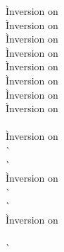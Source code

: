 \begin{description}
  \newcommand{\pushcallfnstack}{\frameexp{F}{\call{\cdot,e}}}
  \begin{tabbing}
    \` Inversion on  \\
    \` Inversion on  \\
    \` Inversion on  \\
    \` Inversion on  \\
    \` Inversion on  \\
    \` Inversion on  \\
    \` Inversion on  \\
    \` Inversion on  \\
  \\
    \` Inversion on  \\
    \`  \\
    \`  \\

    \` Inversion on  \\
    \`  \\
    \`  \\

    \` Inversion on  \\
   \\
    \`  \\


\end{tabbing}
\end{description}
